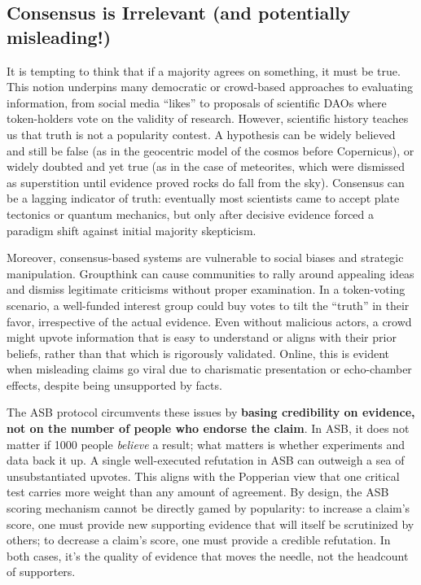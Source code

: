 \subsection{Consensus is Irrelevant (and potentially misleading!)}
It is tempting to think that if a majority agrees on something, it must be true. This notion underpins many democratic or crowd-based approaches to evaluating information, from social media ``likes'' to proposals of scientific DAOs where token-holders vote on the validity of research. However, scientific history teaches us that truth is not a popularity contest. A hypothesis can be widely believed and still be false (as in the geocentric model of the cosmos before Copernicus), or widely doubted and yet true (as in the case of meteorites, which were dismissed as superstition until evidence proved rocks do fall from the sky). Consensus can be a lagging indicator of truth: eventually most scientists came to accept plate tectonics or quantum mechanics, but only after decisive evidence forced a paradigm shift against initial majority skepticism.

Moreover, consensus-based systems are vulnerable to social biases and strategic manipulation. Groupthink can cause communities to rally around appealing ideas and dismiss legitimate criticisms without proper examination. In a token-voting scenario, a well-funded interest group could buy votes to tilt the ``truth'' in their favor, irrespective of the actual evidence. Even without malicious actors, a crowd might upvote information that is easy to understand or aligns with their prior beliefs, rather than that which is rigorously validated. Online, this is evident when misleading claims go viral due to charismatic presentation or echo-chamber effects, despite being unsupported by facts.

The ASB protocol circumvents these issues by \textbf{basing credibility on evidence, not on the number of people who endorse the claim}. In ASB, it does not matter if 1000 people \emph{believe} a result; what matters is whether experiments and data back it up. A single well-executed refutation in ASB can outweigh a sea of unsubstantiated upvotes. This aligns with the Popperian view that one critical test carries more weight than any amount of agreement. By design, the ASB scoring mechanism cannot be directly gamed by popularity: to increase a claim's score, one must provide new supporting evidence that will itself be scrutinized by others; to decrease a claim's score, one must provide a credible refutation. In both cases, it's the quality of evidence that moves the needle, not the headcount of supporters.